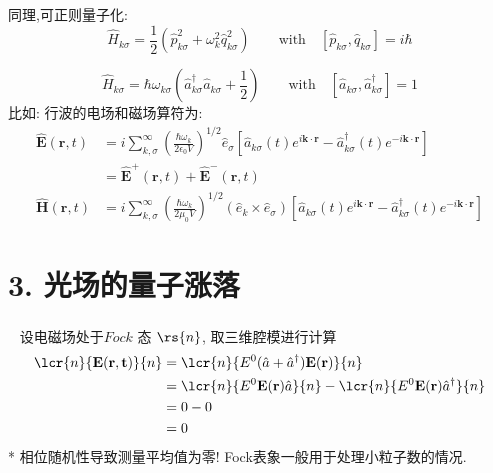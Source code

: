 \begin{frame}        
      同理,可正则量子化:
      \[ \hat{H}_{k\sigma} = \frac{1}{2} (\hat{p}_{k\sigma} ^2 + \omega_k ^2 \hat{q}_{k\sigma} ^2) \qquad \text{with} \quad [\hat{p}_{k\sigma},\hat{q}_{k\sigma}] =i\hbar \]

      \[ \hat{H}_{k\sigma}= \hbar \omega_{k\sigma} \left(\hat{a}^\dagger _{k\sigma} \hat{a} _{k\sigma}+ \frac{1 }{2}\right) \qquad \text{with} \quad [\hat{a} _{k\sigma},\hat{a}^\dagger _{k\sigma}]=1 \]
      比如: 行波的电场和磁场算符为:
      \[   \begin{aligned}
        \hat{\mathbf{E}} (\mathbf{r},t) &=i \sum^\infty _{k,\sigma} (\frac{\hbar\omega_k}{2 \epsilon_0 V } )^{1/2} \hat{e}_\sigma [ \hat{a} _{k\sigma} (t) e^{i \mathbf{k}\cdot \mathbf{r}} - \hat{a} ^\dagger _{k\sigma} (t)  e^{-i \mathbf{k}\cdot \mathbf{r}}] \\
        &= \hat{\mathbf{E}}^+(\mathbf{r},t)+ \hat{\mathbf{E}}^-(\mathbf{r},t) \\
      \hat{\mathbf{H}} (\mathbf{r},t) &=i \sum^\infty _{k,\sigma} (\frac{\hbar\omega_k}{2 \mu_0 V } )^{1/2} (\hat{e}_k \times \hat{e}_\sigma) [ \hat{a} _{k\sigma} (t) e^{i \mathbf{k}\cdot \mathbf{r}} - \hat{a} ^\dagger _{k\sigma} (t)  e^{-i \mathbf{k}\cdot \mathbf{r}}] 
      \end{aligned} \]
\end{frame}

\section{3. 光场的量子涨落}

\begin{frame}
      \frametitle{}
    \证~
    设电磁场处于$Fock$ 态 $\rs{n}$, 取三维腔模进行计算
    \[ 
      \begin{aligned}
        \lcr{n}{\mathbf{E}(\mathbf{r,t})}{n} &= \lcr{n}{E^0  (\hat{a}+ \hat{a} ^\dagger)\mathbf{E}(\mathbf{r})}{n}   \\ 
        &= \lcr{n}{E^0 \mathbf{E}( \mathbf{r})\hat{a} }{n} - \lcr{n}{E^0 \mathbf{E}( \mathbf{r})\hat{a}^\dagger }{n}  \\ 
        &= 0-0 \\ 
        &=0 
      \end{aligned}
      \]   
      * 相位随机性导致测量平均值为零! Fock表象一般用于处理小粒子数的情况.  \\      
\end{frame}


